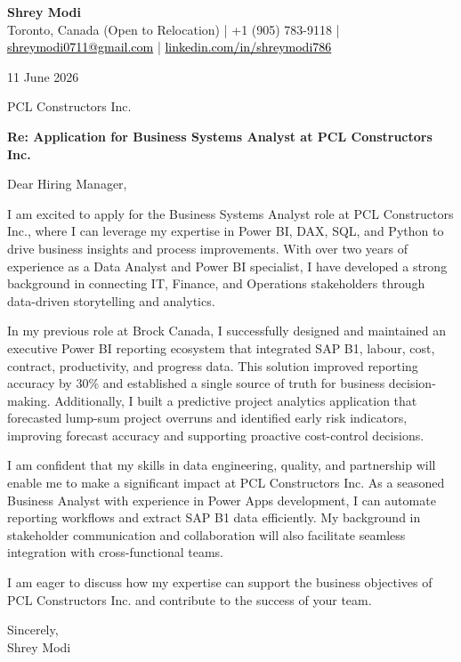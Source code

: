 \documentclass[11pt,letterpaper]{article}
\begin{document}
\begin{center}
  {\Large \bfseries \color{accent} Shrey Modi}\\[0.2em]
  {\small Toronto, Canada (Open to Relocation) | +1 (905) 783-9118 | \href{mailto:shreymodi0711@gmail.com}{\textcolor{black}{shreymodi0711@gmail.com}} | \href{https://linkedin.com/in/shreymodi786}{\textcolor{black}{linkedin.com/in/shreymodi786}}}
\end{center}

\vspace{1em}

11 June 2026

\vspace{0.5em}

PCL Constructors Inc.\\
\vspace{0.5em}

\textbf{Re: Application for Business Systems Analyst at PCL Constructors Inc.}

Dear Hiring Manager,

I am excited to apply for the Business Systems Analyst role at PCL Constructors Inc., where I can leverage my expertise in Power BI, DAX, SQL, and Python to drive business insights and process improvements. With over two years of experience as a Data Analyst and Power BI specialist, I have developed a strong background in connecting IT, Finance, and Operations stakeholders through data-driven storytelling and analytics.

In my previous role at Brock Canada, I successfully designed and maintained an executive Power BI reporting ecosystem that integrated SAP B1, labour, cost, contract, productivity, and progress data. This solution improved reporting accuracy by 30\% and established a single source of truth for business decision-making. Additionally, I built a predictive project analytics application that forecasted lump-sum project overruns and identified early risk indicators, improving forecast accuracy and supporting proactive cost-control decisions.

I am confident that my skills in data engineering, quality, and partnership will enable me to make a significant impact at PCL Constructors Inc. As a seasoned Business Analyst with experience in Power Apps development, I can automate reporting workflows and extract SAP B1 data efficiently. My background in stakeholder communication and collaboration will also facilitate seamless integration with cross-functional teams.

I am eager to discuss how my expertise can support the business objectives of PCL Constructors Inc. and contribute to the success of your team.

Sincerely,\\
Shrey Modi
\end{document}
